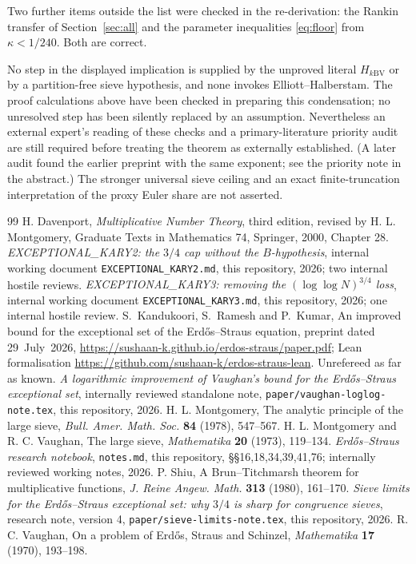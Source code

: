 \documentclass[10pt,reqno]{amsart}
\theoremstyle{remark}
\begin{document}
Two further items outside the list were checked in the re-derivation:
the Rankin transfer of Section~\ref{sec:all} and the parameter
inequalities \eqref{eq:floor} from $\kappa<1/240$.  Both are correct.

No step in the displayed implication is supplied by the unproved literal
$H_{k\mathrm{BV}}$ or by a partition-free sieve hypothesis, and none invokes
Elliott--Halberstam.  The proof calculations above have been checked in
preparing this condensation; no unresolved step has been silently replaced
by an assumption.  Nevertheless an external expert's reading of these checks and a
primary-literature priority audit are still required before treating
the theorem as externally established.  (A later audit found the earlier
preprint \cite{KRK} with the same exponent; see the priority note in the
abstract.)  The stronger universal sieve
ceiling and an exact finite-truncation interpretation of the proxy Euler
share are not asserted.

\begin{thebibliography}{99}
H. Davenport, \emph{Multiplicative Number Theory}, third edition,
revised by H. L. Montgomery, Graduate Texts in Mathematics 74,
Springer, 2000, Chapter 28.
\emph{EXCEPTIONAL\_KARY2: the $3/4$ cap without the $B$-hypothesis},
internal working document \texttt{EXCEPTIONAL\_KARY2.md}, this repository,
2026; two internal hostile reviews.
\emph{EXCEPTIONAL\_KARY3: removing the $(\log\log N)^{3/4}$ loss},
internal working document \texttt{EXCEPTIONAL\_KARY3.md}, this repository,
2026; one internal hostile review.
S.~Kandukoori, S.~Ramesh and P.~Kumar, An improved bound for the
exceptional set of the Erd\H{o}s--Straus equation, preprint dated
29~July~2026, \url{https://sushaan-k.github.io/erdos-straus/paper.pdf};
Lean formalisation \url{https://github.com/sushaan-k/erdos-straus-lean}.
Unrefereed as far as known.
\emph{A logarithmic improvement of Vaughan's bound for the
Erd\H{o}s--Straus exceptional set}, internally reviewed standalone note,
\texttt{paper/vaughan-loglog-note.tex}, this repository, 2026.
H. L. Montgomery, The analytic principle of the large sieve,
\emph{Bull. Amer. Math. Soc.} \textbf{84} (1978), 547--567.
H. L. Montgomery and R. C. Vaughan, The large sieve,
\emph{Mathematika} \textbf{20} (1973), 119--134.
\emph{Erd\H{o}s--Straus research notebook}, \texttt{notes.md}, this
repository, \S\S16,18,34,39,41,76; internally reviewed working notes,
2026.
P. Shiu, A Brun--Titchmarsh theorem for multiplicative functions,
\emph{J. Reine Angew. Math.} \textbf{313} (1980), 161--170.
\emph{Sieve limits for the Erd\H{o}s--Straus exceptional set: why $3/4$
is sharp for congruence sieves}, research note, version 4,
\texttt{paper/sieve-limits-note.tex}, this repository, 2026.
R. C. Vaughan, On a problem of Erd\H{o}s, Straus and Schinzel,
\emph{Mathematika} \textbf{17} (1970), 193--198.
\end{thebibliography}
\end{document}
